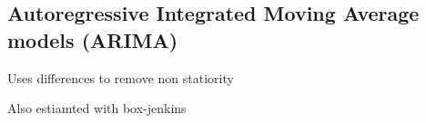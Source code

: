 
\subsection{Autoregressive Integrated Moving Average models (ARIMA)}

Uses differences to remove non statiority

Also estiamted with box-jenkins

